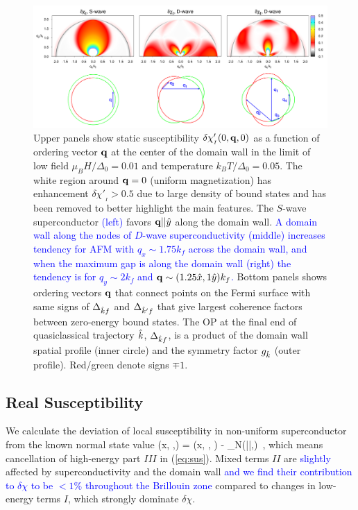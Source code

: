 \documentclass[prb,aps,showpacs,amsmath,twocolumn,10pt]{revtex4-1}
\newcommand{\blue}{\textcolor{blue}}
\begin{document}
\begin{figure}
\includegraphics[scale=0.14]{./Fig2}
\caption{\label{fig:2}
Upper panels show static
susceptibility $\delta\chi'_{{}_I}(0,{\bf q},0)$ 
as a function of ordering vector ${\bf q}$ at the center of the domain wall in the limit of low field $\mu_B
H/\Delta_0=0.01$ and temperature $k_B T/\Delta_0=0.05$. 
The white region around ${\bf q}=0$ (uniform magnetization) has enhancement $\delta\chi'_{{}_I}>0.5$ due to large density of 
bound states and has been removed to better highlight the main features. 
The $S$-wave superconductor \blue{(left)} favors ${\bf q} || \hat{y}$ along the domain wall. \blue{A domain wall along the nodes of $D$-wave superconductivity (middle) increases tendency for AFM with $q_x \sim 1.75 k_f$ across the domain wall, and when the maximum gap is along the domain wall (right) the tendency is for $q_y\sim 2k_f$ and ${\bf q}\sim (1.25\hat{x},1\hat{y})k_f$.}
%
Bottom panels shows ordering vectors ${\bf q}$ that connect points on the Fermi surface with same signs of 
$\Delta_{\hat{k} f }$ and $\Delta_{\hat{k}' f }$ that give largest coherence factors between zero-energy bound states. 
The OP at the final end of quasiclassical trajectory $\hat{k}$, $\Delta_{\hat{k} f }$, 
is a product of the domain wall spatial profile (inner circle) 
and the symmetry factor $g_{\hat{k}}$ (outer profile). Red/green denote signs $\mp1$. 
%
} 
\end{figure}

\subsection{Real Susceptibility}
\label{sec:realChi}
We calculate the deviation of local susceptibility in non-uniform superconductor from the known normal state value 
\be
\delta\chi(x, \vq,\omega) = \chi(x, \vq, \omega) - \chi_{N}(|\vq|,\omega) \,,
\ee
which means cancellation of high-energy part $III$ in (\ref{eq:sus}). 
Mixed terms $II$ are \blue{slightly} affected by superconductivity and the domain wall \blue{and we find their contribution to $\delta\chi$ to be $<1\%$  throughout the Brillouin zone} 
compared to changes in low-energy terms $I$, which strongly dominate $\delta\chi$.
%
\end{document}
